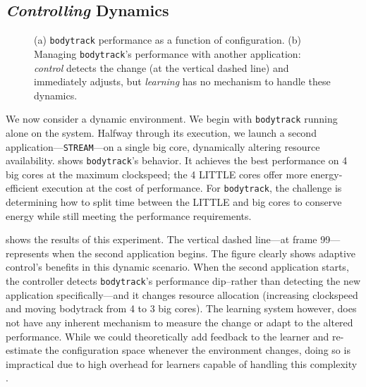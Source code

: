 \subsection{\emph{Controlling} Dynamics}

\begin{figure}
\centering
  \subfloat[]
  {
    
    \label{fig:BODYTRACK_timeline}    
  }
  \caption{(a) \texttt{bodytrack} performance as a function of
    configuration. (b) Managing \texttt{bodytrack}'s performance with
    another application: \emph{control} detects the change (at the
    vertical dashed line) and immediately adjusts, but \emph{learning}
    has no mechanism to handle these dynamics. }
  \label{fig:control}
\end{figure}


We now consider a dynamic environment.  We begin with
\texttt{bodytrack} running alone on the system.  Halfway through its
execution, we launch a second application---\texttt{STREAM}---on a
single big core, dynamically altering resource availability.
 shows \texttt{bodytrack}'s behavior.
It achieves the best performance on 4 big cores at the maximum
clockspeed; the 4 LITTLE cores offer more energy-efficient execution
at the cost of performance.  For \texttt{bodytrack}, the challenge is
determining how to split time between the LITTLE and big cores to
conserve energy while still meeting the performance requirements.

 shows the results of this experiment.
The vertical dashed line---at frame 99---represents when the second
application begins.  The figure clearly shows adaptive control's
benefits in this dynamic scenario.  When the second application
starts, the controller detects \texttt{bodytrack}'s performance
dip--rather than detecting the new application specifically---and it
changes resource allocation (increasing clockspeed and moving
bodytrack from 4 to 3 big cores).  The learning system however, does
not have any inherent mechanism to measure the change or adapt to the
altered performance.  While we could theoretically add feedback to the
learner and re-estimate the configuration space whenever the
environment changes, doing so is impractical due to high overhead for
learners capable of handling this complexity
\cite{Paragon,quasar,LEO}.


